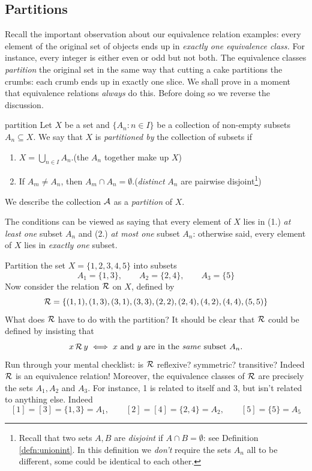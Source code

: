 \subsection{Partitions}

Recall the important observation about our equivalence relation examples: every element of the original set of objects ends up in \emph{exactly one equivalence class.} For instance, every integer is either even or odd but not both. The equivalence classes \emph{partition} the original set in the same way that cutting a cake partitions the crumbs: each crumb ends up in exactly one slice. We shall prove in a moment that equivalence relations \emph{always} do this. Before doing so we reverse the discussion.

\begin{defn}{}{partition}
	Let $X$ be a set and $\{A_n:n\in I\}$ be a collection of non-empty subsets $A_n\subseteq X$. We say that $X$ is \emph{partitioned by} the collection of subsets if
	\begin{enumerate}
		\item $X=\bigcup\limits_{n\in I}A_n$.\hfill(the $A_n$ together make up $X$)
		\item If $A_m\neq A_n$, then $A_m\cap A_n=\emptyset$.\hfill(\emph{distinct} $A_n$ are pairwise disjoint\footnote{Recall that two sets $A,B$ are \emph{disjoint} if $A\cap B=\emptyset$: see Definition \ref{defn:unionint}. In this definition we \emph{don't} require the sets $A_n$ all to be different, some could be identical to each other.})
	\end{enumerate}
	We describe the collection $\mathcal{A}$ as a \emph{partition} of $X$.
\end{defn}

The conditions can be viewed as saying that every element of $X$ lies in (1.) \emph{at least one} subset $A_n$ and (2.) \emph{at most one} subset $A_n$: otherwise said, every element of $X$ lies in \emph{exactly one} subset.

\begin{example}{}{}
	Partition the set $X=\{1,2,3,4,5\}$ into subsets
	\[
		A_1=\{1,3\},\qquad A_2=\{2,4\},\qquad A_3=\{5\}
	\]
	Now consider the relation $\mathcal{R}$ on $X$, defined by
	\[
		\mathcal{R}=\{(1,1),(1,3),(3,1),(3,3),(2,2),(2,4),(4,2),(4,4),(5,5)\}
	\]
	What does $\mathcal{R}$ have to do with the partition? It should be clear that $\mathcal{R}$ could be defined by insisting that
	\[
		x\,\mathcal{R}\,y\iff \text{$x$ and $y$ are in the \emph{same} subset $A_n$.}
	\]
	Run through your mental checklist: is $\mathcal{R}$ reflexive? symmetric? transitive? Indeed $\mathcal{R}$ is an equivalence relation! Moreover, the equivalence classes of $\mathcal{R}$ are precisely the sets $A_1,A_2$ and $A_3$. For instance, 1 is related to itself and 3, but isn't related to anything else. Indeed
	\[
		[1]=[3]=\{1,3\}=A_1,\qquad [2]=[4]=\{2,4\}=A_2,\qquad [5]=\{5\}=A_5
	\]
\end{example} 

